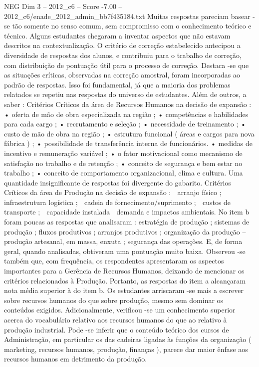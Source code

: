 \begin{textsample}{NEG Dim 3 – 2012\_c6 – Score -7.00 – 2012\_c6/enade\_2012\_admin\_bb7f435184.txt}
Muitas respostas pareciam basear -se tão somente no senso comum, sem compromisso com o conhecimento teórico e técnico.
Alguns estudantes chegaram a inventar aspectos que não estavam descritos na contextualização.
O critério de correção estabelecido antecipou a diversidade de respostas dos alunos, e contribuiu para o trabalho de correção, com distribuição de pontuação útil para o processo de correção.
Destaca -se que as situações críticas, observadas na correção amostral, foram incorporadas ao padrão de respostas.
Isso foi fundamental, já que a maioria dos problemas relatados se repetiu nas respostas do universo de estudantes.
Além de outros, a saber : Critérios Críticos da área de Recursos Humanos na decisão de expansão : • oferta de mão de obra especializada na região ; • competências e habilidades para cada cargo ; • recrutamento e seleção ; • necessidade de treinamento ; • custo de mão de obra na região ; • estrutura funcional ( áreas e cargos para nova fábrica ) ; • possibilidade de transferência interna de funcionários. • medidas de incentivo e remuneração variável ; • o fator motivacional como mecanismo de satisfação no trabalho e de retenção ; • conceito de segurança e bem estar no trabalho ; • conceito de comportamento organizacional, clima e cultura.
Uma quantidade insignificante de respostas foi divergente do gabarito.
Critérios Críticos da área de Produção na decisão de expansão :  arranjo físico ;  infraestrutura logística ;  cadeia de fornecimento/suprimento ;  custos de transporte ;  capacidade instalada  demanda e impactos ambientais.
No item b foram poucas as respostas que analisaram : estratégia de produção ; sistemas de produção ; fluxos produtivos ; arranjos produtivos ; organização da produção – produção artesanal, em massa, enxuta ; segurança das operações.
E, de forma geral, quando analisadas, obtiveram uma pontuação muito baixa.
Observou -se também que, com frequência, os respondentes apresentaram os aspectos importantes para a Gerência de Recursos Humanos, deixando de mencionar os critérios relacionados à Produção.
Portanto, as respostas do item a alcançaram nota média superior à do item b.
Os estudantes arriscaram -se mais a escrever sobre recursos humanos do que sobre produção, mesmo sem dominar os conteúdos exigidos.
Adicionalmente, verificou -se um conhecimento superior acerca do vocabulário relativo aos recursos humanos do que ao relativo à produção industrial.
Pode -se inferir que o conteúdo teórico dos cursos de Administração, em particular os das cadeiras ligadas às funções da organização ( marketing, recursos humanos, produção, finanças ), parece dar maior ênfase aos recursos humanos em detrimento da produção.

\end{textsample}
